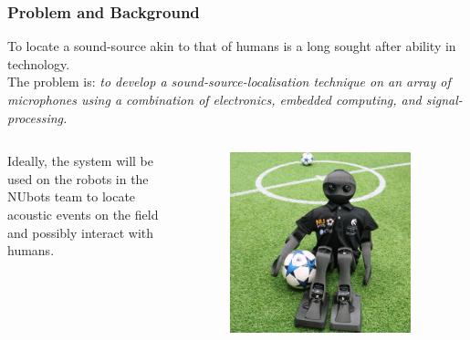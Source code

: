 \documentclass{beamer}
\begin{document}
\begin{frame}
\frametitle{Problem and Background}

To locate a sound-source akin to that of humans is a long sought after ability in technology.\\

The problem is:
\textit{to develop a sound-source-localisation technique on an array of microphones using a combination of electronics, embedded computing, and signal-processing.}\\
	
\begin{columns}

Ideally, the system will be used on the robots in the NUbots team to locate acoustic events on the field and possibly interact with humans.

\begin{figure}[H]
\includegraphics[width=0.9\textwidth]{./NUbot-sitting-down.jpg}
\centering
\end{figure}

\end{columns}

\end{frame}
\end{document}
